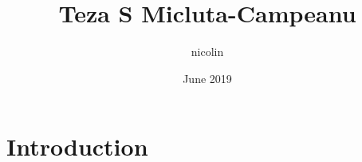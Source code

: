 \documentclass{article}
\title{Teza S Micluta-Campeanu}
\author{nicolin }
\date{June 2019}
\begin{document}
\maketitle

\section{Introduction}
\end{document}
